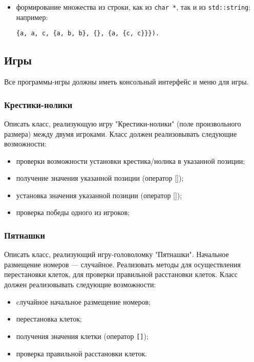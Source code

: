 \documentclass[a4paper,12pt]{article}
\begin{document}
\begin{itemize}
\item формирование множества из строки, как из \lstinline|char *|, так
  и из \lstinline|std::string|; например:
\begin{verbatim}
{a, a, c, {a, b, b}, {}, {a, {c, c}}}).
\end{verbatim}
\end{itemize}

\subsection{Игры}

Все программы-игры должны иметь консольный интерфейс и меню для игры.

\subsubsection{Крестики-нолики}

Описать класс, реализующую игру "Крестики-нолики" (поле произвольного размера) между двумя игроками.
Класс должен реализовывать следующие возможности:

\begin{itemize}
\item проверки возможности установки крестика/нолика в указанной
  позиции;
\item получение значения указанной позиции (оператор []);
\item установка значения указанной позиции (оператор []);
\item проверка победы одного из игроков;
\end{itemize}

\subsubsection{Пятнашки}

Описать класс, реализующий игру-головоломку "Пятнашки". Начальное
размещение номеров — случайное. Реализовать методы для осуществления
перестановки клеток, для проверки правильной расстановки клеток.
Класс должен реализовывать следующие возможности:

\begin{itemize}
\item cлучайное начальное размещение номеров;
\item перестановка клеток;
\item получения значения клетки (оператор \lstinline|[]|);
\item проверка правильной расстановки клеток.
\end{itemize}
\end{document}
